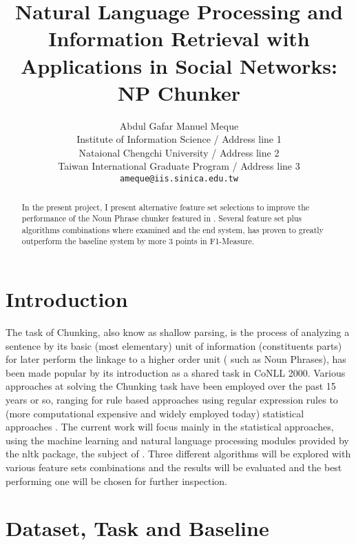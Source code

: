 \documentclass[11pt]{article}
\title{Natural Language Processing and	Information Retrieval with Applications in Social Networks: NP Chunker}
\author{Abdul Gafar Manuel Meque \\
		Institute of Information Science / Address line 1 \\
		Nataional Chengchi University / Address line 2 \\
		Taiwan International Graduate Program / Address line 3 \\
		{\tt ameque@iis.sinica.edu.tw}  \\}
\date{}
\begin{document}
\maketitle
\begin{abstract}
  In the present project, I present alternative feature set selections to improve the performance of the Noun Phrase chunker featured in \cite{Nltk:09}.
  Several feature set plus algorithms combinations where examined and the end system, has proven to greatly outperform the baseline system by more 3 points in F1-Measure.
\end{abstract}

\section{Introduction}

The task of Chunking, also know as shallow parsing, is the process of analyzing a sentence by its basic (most elementary) unit of information (constituents parts) for later perform the linkage to a higher order unit ( such as Noun Phrases), has been made popular by its introduction as a shared task in CoNLL 2000.
Various approaches at solving the Chunking task have been employed over the past 15 years or so, ranging for rule based approaches using regular expression rules to (more computational expensive and widely employed today) statistical approaches \cite{SLP:09}. 
The current work will focus mainly in the statistical approaches, using the machine learning and natural language processing modules provided by the nltk package, the subject of \cite{Nltk:09}. Three different algorithms will be explored with various feature sets combinations and the results will be evaluated and the best performing one will be chosen for further inspection.



\section{Dataset, Task and Baseline}
\end{document}
